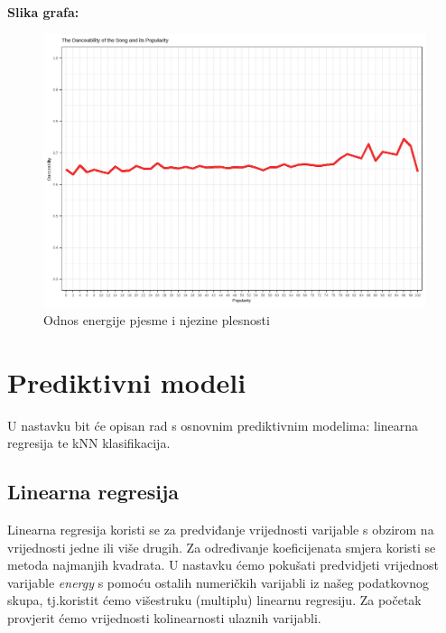     
    \textbf{Slika grafa:}
    \begin{figure}[H]
    	\includegraphics[scale=0.9]{slike/danceability_popularity.png}
    	\centering
    	\caption{Odnos energije pjesme i njezine plesnosti}
    	
    \end{figure}
    
    

\clearpage
\section{Prediktivni modeli}

	U nastavku bit će opisan rad s osnovnim prediktivnim modelima: linearna regresija te kNN klasifikacija. 
	
	\subsection{Linearna regresija}
	
	Linearna regresija koristi se za predviđanje vrijednosti varijable s obzirom na vrijednosti jedne ili više drugih. Za određivanje koeficijenata smjera koristi se metoda najmanjih kvadrata. U nastavku ćemo pokušati predvidjeti vrijednost varijable \textit{energy} s pomoću ostalih numeričkih varijabli iz našeg podatkovnog skupa, tj.koristit ćemo višestruku (multiplu) linearnu regresiju.
	Za početak provjerit ćemo vrijednosti kolinearnosti ulaznih varijabli.
	
